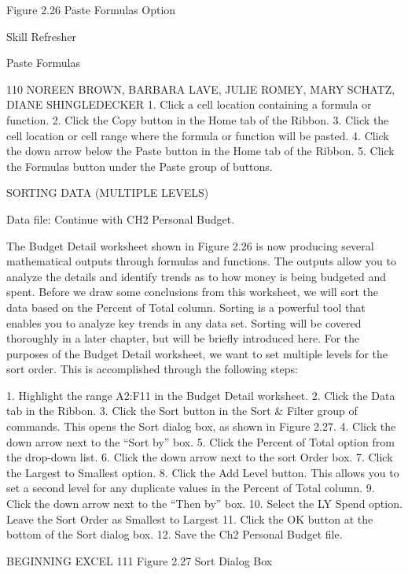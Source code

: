 Figure 2.26 Paste Formulas Option




Skill Refresher


Paste Formulas



110 NOREEN BROWN, BARBARA LAVE, JULIE ROMEY, MARY SCHATZ, DIANE SHINGLEDECKER
1. Click a cell location containing a formula or function.
2. Click the Copy button in the Home tab of the Ribbon.
3. Click the cell location or cell range where the formula or function will be pasted.
4. Click the down arrow below the Paste button in the Home tab of the Ribbon.
5. Click the Formulas button under the Paste group of buttons.



SORTING DATA (MULTIPLE LEVELS)

Data file: Continue with CH2 Personal Budget.

The Budget Detail worksheet shown in Figure 2.26 is now producing several mathematical outputs
through formulas and functions. The outputs allow you to analyze the details and identify trends as
to how money is being budgeted and spent. Before we draw some conclusions from this worksheet,
we will sort the data based on the Percent of Total column. Sorting is a powerful tool that enables you
to analyze key trends in any data set. Sorting will be covered thoroughly in a later chapter, but will
be briefly introduced here. For the purposes of the Budget Detail worksheet, we want to set multiple
levels for the sort order. This is accomplished through the following steps:

1. Highlight the range A2:F11 in the Budget Detail worksheet.
2. Click the Data tab in the Ribbon.
3. Click the Sort button in the Sort \& Filter group of commands. This opens the Sort dialog box, as
shown in Figure 2.27.
4. Click the down arrow next to the “Sort by” box.
5. Click the Percent of Total option from the drop-down list.
6. Click the down arrow next to the sort Order box.
7. Click the Largest to Smallest option.
8. Click the Add Level button. This allows you to set a second level for any duplicate values in the
Percent of Total column.
9. Click the down arrow next to the “Then by” box.
10. Select the LY Spend option. Leave the Sort Order as Smallest to Largest
11. Click the OK button at the bottom of the Sort dialog box.
12. Save the Ch2 Personal Budget file.




BEGINNING EXCEL 111
Figure 2.27 Sort Dialog Box


